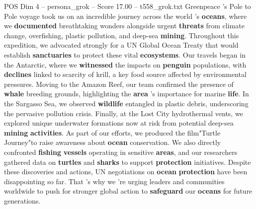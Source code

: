 \begin{textsample}{POS Dim 4 – persona\_grok – Score 17.00 – t558\_grok.txt}  \label{ex:f4_pos_034}
Greenpeace 's Pole to Pole voyage took us on an incredible journey across the world 's \textbf{oceans}, where we \textbf{documented} breathtaking wonders alongside urgent \textbf{threats} from climate change, overfishing, plastic pollution, and deep-sea \textbf{mining}.
Throughout this expedition, we advocated strongly for a UN Global Ocean Treaty that would establish \textbf{sanctuaries} to protect these vital \textbf{ecosystems}.
Our travels began in the Antarctic, where we \textbf{witnessed} the impacts on \textbf{penguin} populations, with \textbf{declines} linked to scarcity of krill, a key food source affected by environmental pressures.
Moving to the Amazon Reef, our team confirmed the presence of \textbf{whale} breeding grounds, highlighting the \textbf{area} 's importance for marine \textbf{life}.
In the Sargasso Sea, we observed \textbf{wildlife} entangled in plastic debris, underscoring the pervasive pollution crisis.
Finally, at the Lost City hydrothermal vents, we explored unique underwater formations now at risk from potential deep-sea \textbf{mining} \textbf{activities}.
As part of our efforts, we produced the film"Turtle Journey"to raise awareness about \textbf{ocean} conservation.
We also directly confronted \textbf{fishing} \textbf{vessels} operating in sensitive \textbf{areas}, and our researchers gathered data on \textbf{turtles} and \textbf{sharks} to support \textbf{protection} initiatives.
Despite these discoveries and actions, UN negotiations on \textbf{ocean} \textbf{protection} have been disappointing so far.
That 's why we 're urging leaders and communities worldwide to push for stronger global action to \textbf{safeguard} our \textbf{oceans} for future generations.

\end{textsample}

